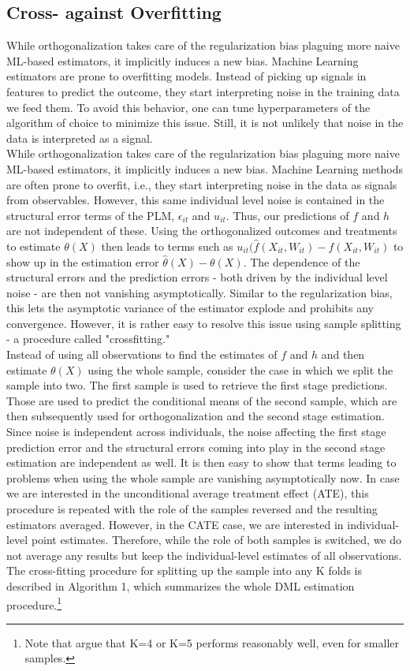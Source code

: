 \subsection{Cross- against Overfitting} \label{sec:cross-fitting}
While orthogonalization takes care of the regularization bias plaguing more naive ML-based estimators, it implicitly induces a new bias. Machine Learning estimators are prone to overfitting models. Instead of picking up signals in features to predict the outcome, they start interpreting noise in the training data we feed them. To avoid this behavior, one can tune hyperparameters of the algorithm of choice to minimize this issue. Still, it is not unlikely that noise in the data is interpreted as a signal. \\
While orthogonalization takes care of the regularization bias plaguing more naive ML-based estimators, it implicitly induces a new bias. Machine Learning methods are often prone to overfit, i.e., they start interpreting noise in the data as signals from observables. However, this same individual level noise is contained in the structural error terms of the PLM, $\epsilon_{it}$ and $u_{it}$. Thus, our predictions of $f$ and $h$ are not independent of these. Using the orthogonalized outcomes and treatments to estimate $\theta(X)$ then leads to terms such as $u_{it}(\hat{f}(X_{it}, W_{it}) - f(X_{it}, W_{it})$ to show up in the estimation error $\hat{\theta}(X) - \theta(X)$. The dependence of the structural errors and the prediction errors - both driven by the individual level noise - are then not vanishing asymptotically. Similar to the regularization bias, this lets the asymptotic variance of the estimator explode and prohibits any convergence. However, it is rather easy to resolve this issue using sample splitting - a procedure called "crossfitting." \\ 
Instead of using all observations to find the estimates of $f$ and $h$ and then estimate $\theta(X)$ using the whole sample, consider the case in which we split the sample into two. The first sample is used to retrieve the first stage predictions. Those are used to predict the conditional means of the second sample, which are then subsequently used for orthogonalization and the second stage estimation. Since noise is independent across individuals, the noise affecting the first stage prediction error and the structural errors coming into play in the second stage estimation are independent as well. It is then easy to show that terms leading to problems when using the whole sample are vanishing asymptotically now. In case we are interested in the unconditional average treatment effect (ATE), this procedure is repeated with the role of the samples reversed and the resulting estimators averaged. However, in the CATE case, we are interested in individual-level point estimates. Therefore, while the role of both samples is switched, we do not average any results but keep the individual-level estimates of all observations. The cross-fitting procedure for splitting up the sample into any K folds is described in Algorithm 1, which summarizes the whole DML estimation procedure.\footnote{Note that \cite{DML2017} argue that K=4 or K=5 performs reasonably well, even for smaller samples.} 

